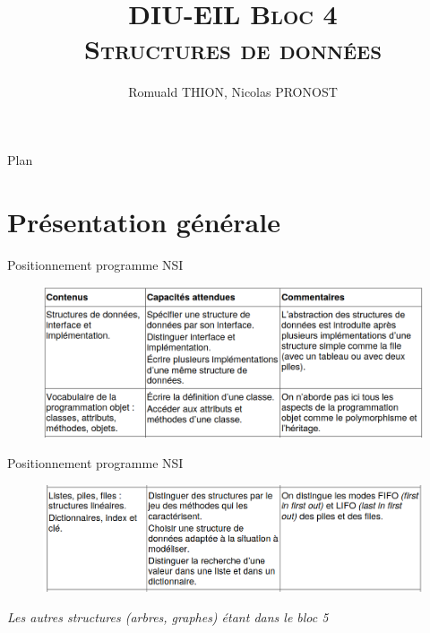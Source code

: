 \documentclass[table]{beamer}
\title[DIU-EIL Bloc 4 -- SD]{
    \textsc{DIU-EIL Bloc 4\\ Structures de données}
}
\author[R. THION, N. PRONOST]{
    Romuald THION, Nicolas PRONOST
}
\institute{ 
{  
    \url{https://forge.univ-lyon1.fr/diu-eil/bloc4}}
}
\begin{document}
	\begin{frame}
		\titlepage
	\end{frame}

    \begin{frame}{Plan}
        \tableofcontents[hideallsubsections]
    \end{frame} 

\section{Présentation générale}


\begin{frame}{Positionnement programme NSI}
  
    \begin{figure}
      \centering
      \includegraphics[width=0.9\linewidth]{./NSIa.png}%
    \end{figure}
\end{frame}


\begin{frame}{Positionnement programme NSI}
  

    \begin{figure}
      \centering
      \includegraphics[width=0.9\linewidth]{./NSIb.png}%
    \end{figure}
  
  \begin{center}
    \emph{Les autres structures (arbres, graphes) étant dans le bloc 5}
  \end{center}
  
\end{frame}
\end{document}
